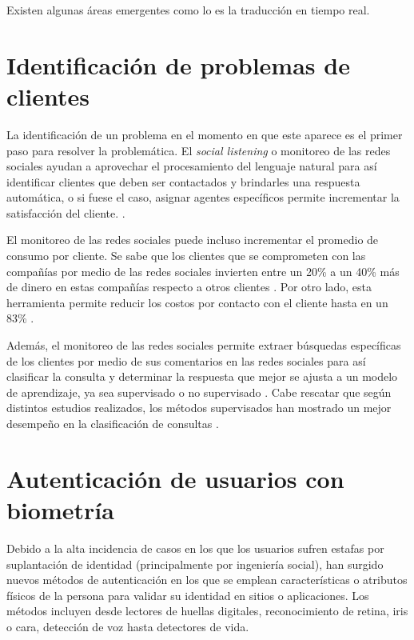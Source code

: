 \documentclass[conference]{IEEEtran}
\begin{document}
Existen algunas áreas emergentes como lo es la traducción en tiempo real.

\section{Identificación de problemas de clientes}

La identificación de un problema en el momento en que este aparece es el primer paso para resolver la problemática. El \textit{social listening} o monitoreo de las redes  sociales \cite{socialmonitorcompare} ayudan a aprovechar el procesamiento del lenguaje natural para así identificar clientes que deben ser contactados y brindarles una respuesta automática, o si fuese el caso, asignar agentes específicos permite incrementar la satisfacción del cliente. \cite{11cases}.

El monitoreo de las redes sociales puede incluso incrementar el promedio de consumo por cliente. Se sabe que los clientes que se comprometen con las compañías por medio de las redes sociales invierten entre un 20\% a un 40\% más de dinero en estas compañías respecto a otros clientes \cite{socialmonitor}. Por otro lado, esta herramienta permite reducir los costos por contacto con el cliente hasta en un 83\% \cite{mckinsey, whysocialmonitor}.

Además, el monitoreo de las redes sociales permite extraer búsquedas específicas de los clientes por medio de sus comentarios en las redes sociales para así clasificar la consulta y determinar la respuesta que mejor se ajusta a un modelo de aprendizaje, ya sea supervisado o no supervisado \cite{8703237}. Cabe rescatar que según distintos estudios realizados, los métodos supervisados han mostrado un mejor desempeño en la clasificación de consultas \cite{8703237}.

\section{Autenticación de usuarios con biometría}

Debido a la alta incidencia de casos en los que los usuarios sufren estafas por suplantación de identidad (principalmente por ingeniería social), han surgido nuevos métodos de autenticación en los que se emplean características o atributos físicos de la persona para validar su identidad en sitios o aplicaciones. Los métodos incluyen desde lectores de huellas digitales, reconocimiento de retina, iris o cara, detección de voz hasta detectores de vida.
\end{document}
